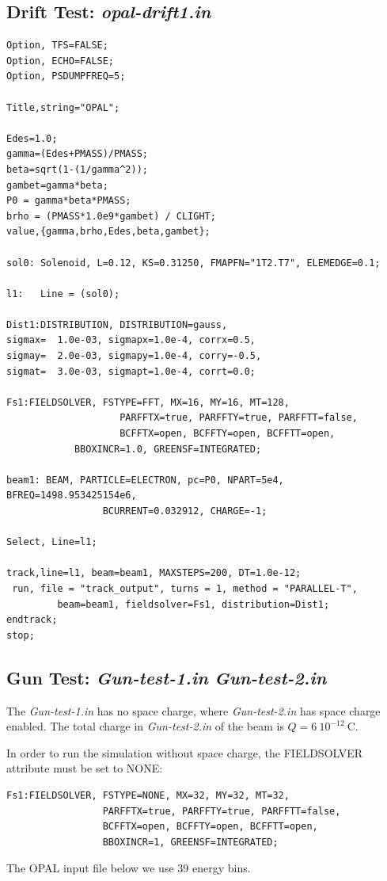\documentclass{psi-note}    %
\begin{document}
{\subsection{Drift Test: {\it opal-drift1.in}}
\begin{verbatim}
Option, TFS=FALSE;
Option, ECHO=FALSE;
Option, PSDUMPFREQ=5;

Title,string="OPAL";

Edes=1.0;
gamma=(Edes+PMASS)/PMASS;
beta=sqrt(1-(1/gamma^2));
gambet=gamma*beta;
P0 = gamma*beta*PMASS;
brho = (PMASS*1.0e9*gambet) / CLIGHT;
value,{gamma,brho,Edes,beta,gambet};

sol0: Solenoid, L=0.12, KS=0.31250, FMAPFN="1T2.T7", ELEMEDGE=0.1;

l1:   Line = (sol0);

Dist1:DISTRIBUTION, DISTRIBUTION=gauss,
sigmax=  1.0e-03, sigmapx=1.0e-4, corrx=0.5,
sigmay=  2.0e-03, sigmapy=1.0e-4, corry=-0.5,
sigmat=  3.0e-03, sigmapt=1.0e-4, corrt=0.0;

Fs1:FIELDSOLVER, FSTYPE=FFT, MX=16, MY=16, MT=128,
                 	PARFFTX=true, PARFFTY=true, PARFFTT=false,
                 	BCFFTX=open, BCFFTY=open, BCFFTT=open,
     		BBOXINCR=1.0, GREENSF=INTEGRATED;

beam1: BEAM, PARTICLE=ELECTRON, pc=P0, NPART=5e4, BFREQ=1498.953425154e6, 
		         BCURRENT=0.032912, CHARGE=-1;

Select, Line=l1;

track,line=l1, beam=beam1, MAXSTEPS=200, DT=1.0e-12;
 run, file = "track_output", turns = 1, method = "PARALLEL-T", 
         beam=beam1, fieldsolver=Fs1, distribution=Dist1;
endtrack;
stop;
\end{verbatim}

\subsection{Gun Test: {\it Gun-test-1.in} {\it Gun-test-2.in}}
The {\it Gun-test-1.in} has no space charge, where {\it Gun-test-2.in} has space
charge enabled. The total charge in {\it Gun-test-2.in} of the beam is $Q=6
~10^{-12}~ \mbox{C}$.

In order to run the simulation without space charge, the FIELDSOLVER attribute
must be set to NONE:
\begin{verbatim}
Fs1:FIELDSOLVER, FSTYPE=NONE, MX=32, MY=32, MT=32, 
                 PARFFTX=true, PARFFTY=true, PARFFTT=false,
                 BCFFTX=open, BCFFTY=open, BCFFTT=open, 
                 BBOXINCR=1, GREENSF=INTEGRATED;
\end{verbatim}
The OPAL input file below we use 39 energy bins.

}
\end{document}
